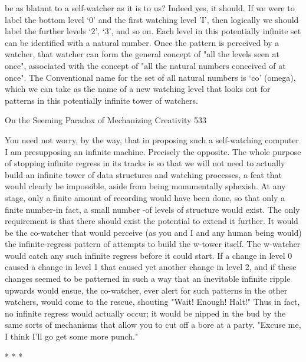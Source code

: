 be as blatant to a self-watcher as it is to us? Indeed yes, it should. If we were to label
the bottom level `0' and the first watching level 'I', then logically we should label the
further levels `2', `3', and so on. Each level in this potentially infinite set can be
identified with a natural number. Once the pattern is perceived by a watcher, that
watcher can form the general concept of "all the levels seen at once", associated with
the concept of "all the natural numbers conceived of at once". The Conventional name
for the set of all natural numbers is `co' (omega), which we can take as the name of a
new watching level that looks out for patterns in this potentially infinite tower of
watchers.




On the Seeming Paradox of Mechanizing Creativity                                      533

        You need not worry, by the way, that in proposing such a self-watching
computer I am presupposing an infinite machine. Precisely the opposite. The whole
purpose of stopping infinite regress in its tracks is so that we will not need to actually
build an infinite tower of data structures and watching processes, a feat that would
clearly be impossible, aside from being monumentally sphexish. At any stage, only a
finite amount of recording would have been done, so that only a finite number-in fact,
a small number -of levels of structure would exist. The only requirement is that there
should exist the potential to extend it further.
        It would be the co-watcher that would perceive (as you and I and any human
being would) the infinite-regress pattern of attempts to build the w-tower itself. The
w-watcher would catch any such infinite regress before it could start. If a change in
level 0 caused a change in level 1 that caused yet another change in level 2, and if
these changes seemed to be patterned in such a way that an inevitable infinite ripple
upwards would ensue, the co-watcher, ever alert for such patterns in the other
watchers, would come to the rescue, shouting "Wait! Enough! Halt!" Thus in fact, no
infinite regress would actually occur; it would be nipped in the bud by the same sorts
of mechanisms that allow you to cut off a bore at a party. "Excuse me, I think I'll go
get some more punch."

*   *   *

